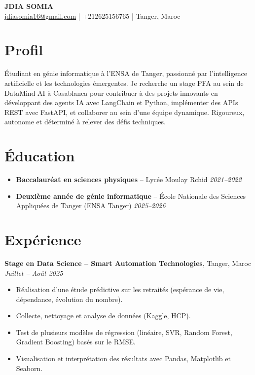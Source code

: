 \documentclass[a4paper,11pt]{article}
\begin{document}
\begin{center}
    {\Huge \textbf{JDIA SOMIA}} \\[6pt]
    \href{mailto:jdiasomia16@gmail.com}{jdiasomia16@gmail.com} \quad|\quad
    +212625156765 \quad|\quad
    Tanger, Maroc
\end{center}

\vspace{6pt}

\section*{Profil}
Étudiant en génie informatique à l'ENSA de Tanger, passionné par l'intelligence artificielle et les technologies émergentes. Je recherche un stage PFA au sein de DataMind AI à Casablanca pour contribuer à des projets innovants en développant des agents IA avec LangChain et Python, implémenter des APIs REST avec FastAPI, et collaborer au sein d'une équipe dynamique. Rigoureux, autonome et déterminé à relever des défis techniques.

\section*{Éducation}
\begin{itemize}[leftmargin=*, noitemsep]
    \item \textbf{Baccalauréat en sciences physiques} – Lycée Moulay Rchid \hfill \textit{2021–2022}
    \item \textbf{Deuxième année de génie informatique} – École Nationale des Sciences Appliquées de Tanger (ENSA Tanger) \hfill \textit{2025–2026}
\end{itemize}

\section*{Expérience}

\textbf{Stage en Data Science – Smart Automation Technologies}, Tanger, Maroc \hfill \textit{Juillet – Août 2025}
\begin{itemize}[leftmargin=*, noitemsep]
    \item Réalisation d'une étude prédictive sur les retraités (espérance de vie, dépendance, évolution du nombre).
    \item Collecte, nettoyage et analyse de données (Kaggle, HCP).
    \item Test de plusieurs modèles de régression (linéaire, SVR, Random Forest, Gradient Boosting) basés sur le RMSE.
    \item Visualisation et interprétation des résultats avec Pandas, Matplotlib et Seaborn.
\end{itemize}
\end{document}
